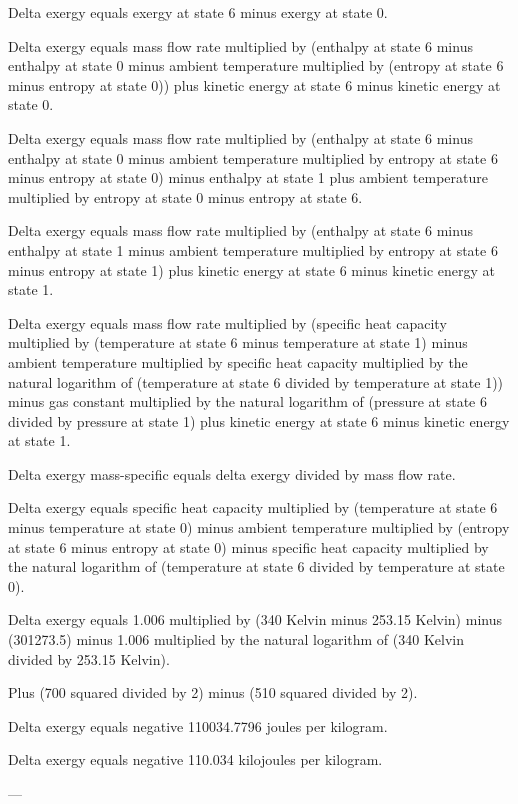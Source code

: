 Delta exergy equals exergy at state 6 minus exergy at state 0.  

Delta exergy equals mass flow rate multiplied by (enthalpy at state 6 minus enthalpy at state 0 minus ambient temperature multiplied by (entropy at state 6 minus entropy at state 0)) plus kinetic energy at state 6 minus kinetic energy at state 0.  

Delta exergy equals mass flow rate multiplied by (enthalpy at state 6 minus enthalpy at state 0 minus ambient temperature multiplied by entropy at state 6 minus entropy at state 0) minus enthalpy at state 1 plus ambient temperature multiplied by entropy at state 0 minus entropy at state 6.  

Delta exergy equals mass flow rate multiplied by (enthalpy at state 6 minus enthalpy at state 1 minus ambient temperature multiplied by entropy at state 6 minus entropy at state 1) plus kinetic energy at state 6 minus kinetic energy at state 1.  

Delta exergy equals mass flow rate multiplied by (specific heat capacity multiplied by (temperature at state 6 minus temperature at state 1) minus ambient temperature multiplied by specific heat capacity multiplied by the natural logarithm of (temperature at state 6 divided by temperature at state 1)) minus gas constant multiplied by the natural logarithm of (pressure at state 6 divided by pressure at state 1) plus kinetic energy at state 6 minus kinetic energy at state 1.  

Delta exergy mass-specific equals delta exergy divided by mass flow rate.  

Delta exergy equals specific heat capacity multiplied by (temperature at state 6 minus temperature at state 0) minus ambient temperature multiplied by (entropy at state 6 minus entropy at state 0) minus specific heat capacity multiplied by the natural logarithm of (temperature at state 6 divided by temperature at state 0).  

Delta exergy equals 1.006 multiplied by (340 Kelvin minus 253.15 Kelvin) minus (301273.5) minus 1.006 multiplied by the natural logarithm of (340 Kelvin divided by 253.15 Kelvin).  

Plus (700 squared divided by 2) minus (510 squared divided by 2).  

Delta exergy equals negative 110034.7796 joules per kilogram.  

Delta exergy equals negative 110.034 kilojoules per kilogram.  

---